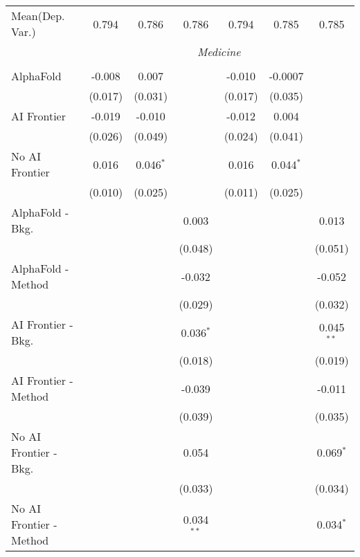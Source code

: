 \begin{tabular}{lcccccc}
Mean(Dep. Var.) & 0.794 & 0.786 & 0.786 & 0.794 & 0.785 & 0.785 \\
 & \multicolumn{6}{c}{\textit{Medicine}} \\ \\
   AlphaFold               & -0.008  & 0.007       &              & -0.010  & -0.0007     &   \\   
                           & (0.017) & (0.031)     &              & (0.017) & (0.035)     &   \\   
   AI Frontier             & -0.019  & -0.010      &              & -0.012  & 0.004       &   \\   
                           & (0.026) & (0.049)     &              & (0.024) & (0.041)     &   \\   
   No AI Frontier          & 0.016   & 0.046$^{*}$ &              & 0.016   & 0.044$^{*}$ &   \\   
                           & (0.010) & (0.025)     &              & (0.011) & (0.025)     &   \\   
   AlphaFold - Bkg.        &         &             & 0.003        &         &             & 0.013\\   
                           &         &             & (0.048)      &         &             & (0.051)\\   
   AlphaFold - Method      &         &             & -0.032       &         &             & -0.052\\   
                           &         &             & (0.029)      &         &             & (0.032)\\   
   AI Frontier - Bkg.      &         &             & 0.036$^{*}$  &         &             & 0.045$^{**}$\\   
                           &         &             & (0.018)      &         &             & (0.019)\\   
   AI Frontier - Method    &         &             & -0.039       &         &             & -0.011\\   
                           &         &             & (0.039)      &         &             & (0.035)\\   
   No AI Frontier - Bkg.   &         &             & 0.054        &         &             & 0.069$^{*}$\\   
                           &         &             & (0.033)      &         &             & (0.034)\\   
   No AI Frontier - Method &         &             & 0.034$^{**}$ &         &             & 0.034$^{*}$\\   

\end{tabular}
